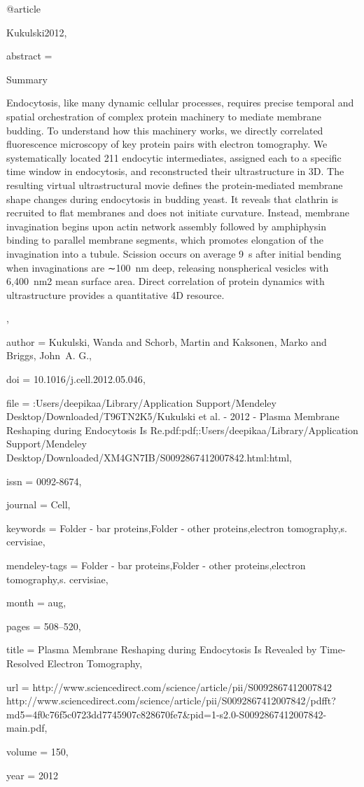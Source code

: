 @article{Kukulski2012,

abstract = {Summary

Endocytosis, like many dynamic cellular processes, requires precise temporal and spatial orchestration of complex protein machinery to mediate membrane budding. To understand how this machinery works, we directly correlated fluorescence microscopy of key protein pairs with electron tomography. We systematically located 211 endocytic intermediates, assigned each to a specific time window in endocytosis, and reconstructed their ultrastructure in 3D. The resulting virtual ultrastructural movie defines the protein-mediated membrane shape changes during endocytosis in budding yeast. It reveals that clathrin is recruited to flat membranes and does not initiate curvature. Instead, membrane invagination begins upon actin network assembly followed by amphiphysin binding to parallel membrane segments, which promotes elongation of the invagination into a tubule. Scission occurs on average 9 s after initial bending when invaginations are ∼100 nm deep, releasing nonspherical vesicles with 6,400 nm2 mean surface area. Direct correlation of protein dynamics with ultrastructure provides a quantitative 4D resource.},

author = {Kukulski, Wanda and Schorb, Martin and Kaksonen, Marko and Briggs, John A. G.},

doi = {10.1016/j.cell.2012.05.046},

file = {:Users/deepikaa/Library/Application Support/Mendeley Desktop/Downloaded/T96TN2K5/Kukulski et al. - 2012 - Plasma Membrane Reshaping during Endocytosis Is Re.pdf:pdf;:Users/deepikaa/Library/Application Support/Mendeley Desktop/Downloaded/XM4GN7IB/S0092867412007842.html:html},

issn = {0092-8674},

journal = {Cell},

keywords = {Folder - bar proteins,Folder - other proteins,electron tomography,s. cervisiae},

mendeley-tags = {Folder - bar proteins,Folder - other proteins,electron tomography,s. cervisiae},

month = {aug},

pages = {508--520},

title = {{Plasma Membrane Reshaping during Endocytosis Is Revealed by Time-Resolved Electron Tomography}},

url = {http://www.sciencedirect.com/science/article/pii/S0092867412007842 http://www.sciencedirect.com/science/article/pii/S0092867412007842/pdfft?md5=4f0c76f5c0723dd7745907c828670fe7{\&}pid=1-s2.0-S0092867412007842-main.pdf},

volume = {150},

year = {2012}

}

